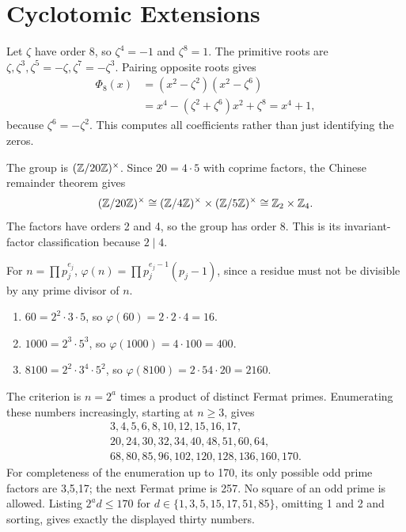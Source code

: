 \section{Cyclotomic Extensions}

Let $\zeta$ have order 8, so $\zeta^4=-1$ and $\zeta^8=1$. The primitive roots are $\zeta,\zeta^3,\zeta^5=-\zeta,\zeta^7=-\zeta^3$. Pairing opposite roots gives
\begin{align*}
\Phi_8(x)&=(x^2-\zeta^2)(x^2-\zeta^6)\\
&=x^4-(\zeta^2+\zeta^6)x^2+\zeta^8=x^4+1,
\end{align*}
because $\zeta^6=-\zeta^2$. This computes all coefficients rather than just identifying the zeros.

The group is $(\mathbb{Z}/20\mathbb{Z})^\times$. Since $20=4\cdot5$ with coprime factors, the Chinese remainder theorem gives
\[(\mathbb{Z}/20\mathbb{Z})^\times\cong(\mathbb{Z}/4\mathbb{Z})^\times\times(\mathbb{Z}/5\mathbb{Z})^\times\cong\mathbb{Z}_2\times\mathbb{Z}_4.\]
The factors have orders 2 and 4, so the group has order 8. This is its invariant-factor classification because $2\mid4$.

For $n=\prod p_j^{e_j}$, $\varphi(n)=\prod p_j^{e_j-1}(p_j-1)$, since a residue must not be divisible by any prime divisor of $n$.
\begin{enumerate}[label=(\alph*)]
\item $60=2^2\cdot3\cdot5$, so $\varphi(60)=2\cdot2\cdot4=16$.
\item $1000=2^3\cdot5^3$, so $\varphi(1000)=4\cdot100=400$.
\item $8100=2^2\cdot3^4\cdot5^2$, so $\varphi(8100)=2\cdot54\cdot20=2160$.
\end{enumerate}

The criterion is $n=2^a$ times a product of distinct Fermat primes. Enumerating these numbers increasingly, starting at $n\ge3$, gives
\[
\begin{gathered}
3,4,5,6,8,10,12,15,16,17,\\
20,24,30,32,34,40,48,51,60,64,\\
68,80,85,96,102,120,128,136,160,170.
\end{gathered}
\]
For completeness of the enumeration up to 170, its only possible odd prime factors are 3,5,17; the next Fermat prime is 257. No square of an odd prime is allowed. Listing $2^a d\le170$ for $d\in\{1,3,5,15,17,51,85\}$, omitting 1 and 2 and sorting, gives exactly the displayed thirty numbers.

